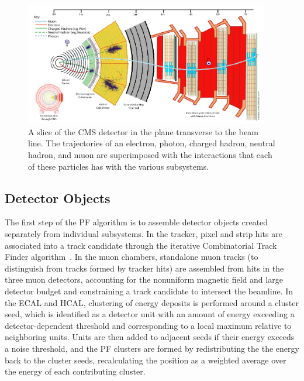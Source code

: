 \begin{figure}[ht]
 \begin{center}
    \includegraphics[width=0.95\textwidth]{figures/objects/pf.pdf}
      \end{center}
\caption{A slice of the CMS detector in the plane transverse to the beam line.
The trajectories of an electron, photon, charged hadron, neutral hadron, and muon are superimposed
with the interactions that each of these particles has with the various subsystems.}
\label{fig:PF}
\end{figure}

\subsection{Detector Objects\label{subsec:detobj}}

The first step of the PF algorithm is to assemble detector objects created separately from
individual subsystems. In the tracker, pixel and strip hits are associated into a track candidate
through the iterative Combinatorial Track Finder algorithm~\cite{PFPAS2009}. In the muon chambers,
standalone muon tracks (to distinguish from tracks formed by tracker hits)
are assembled from hits in the three muon detectors, accounting
for the nonuniform magnetic field and large detector budget and constraining a track candidate to
intersect the beamline. In the ECAL and HCAL, clustering of energy deposits is performed around a
cluster seed, which is identified as a detector unit with an amount of energy exceeding a
detector-dependent threshold and corresponding to a local maximum relative to neighboring units.
Units are then added to adjacent seeds if their energy exceeds a noise threshold,
and the PF clusters are
formed by redistributing the the energy back to the cluster seeds, recalculating the position as a
weighted average over the energy of each contributing cluster.

